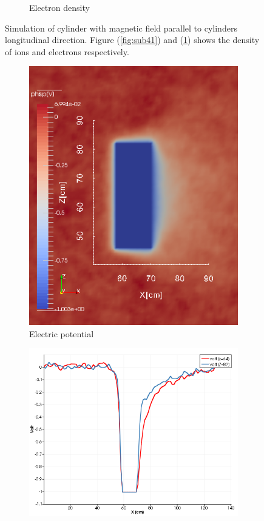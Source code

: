 \documentclass[twoside]{article}
\begin{document}
\begin{figure}[H]
\begin{subfigure}{.5\textwidth}
  \caption{Electron density}
  \label{fig:sub42}
\end{subfigure}
\caption{Simulation of cylinder with magnetic field parallel to cylinders longitudinal direction. Figure (\ref{fig:sub41}) and (\ref{fig:sub42}) shows the density of ions and electrons respectively. }
\label{fig:4}
\end{figure}

\begin{figure}[H]
\centering
\begin{subfigure}{.5\textwidth}
  \includegraphics[width=0.8\linewidth]{zoom/phisp_Y(zoom).png}
  \caption{Electric potential}
  \label{fig:sub51}
\end{subfigure}%
\begin{subfigure}{.5\textwidth}
  \hspace{-13mm}
  \includegraphics[width=1.2\linewidth]{zoom/plot_phisp(Z64Z82onphisp_Y).png}

\end{subfigure}
\end{figure}
\end{document}

